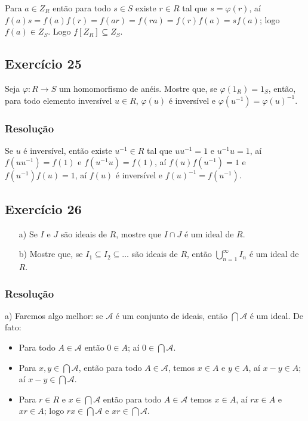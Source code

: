 \documentclass[10pt,a4paper]{article}
\begin{document}
Para $a\in Z_R$ então para todo $s\in S$ existe $r\in R$ tal que $s=\varphi(r)$, aí $f(a)s=f(a)f(r)=f(ar)=f(ra)=f(r)f(a)=sf(a)$; logo $f(a)\in Z_S$. Logo $f[Z_R]\subseteq Z_S$.

\subsection*{Exercício 25}
Seja $\varphi:R\rightarrow S$ um homomorfismo de anéis. Mostre que, se $\varphi(1_R)=1_S$, então, para todo elemento inversível $u\in R$, $\varphi(u)$ é inversível e $\varphi(u^{-1})=\varphi(u)^{-1}$.

\subsubsection*{Resolução}

Se $u$ é inversível, então existe $u^{-1}\in R$ tal que $uu^{-1}=1$ e $u^{-1}u=1$, aí $f(uu^{-1})=f(1)$ e $f(u^{-1}u)=f(1)$, aí $f(u)f(u^{-1})=1$ e $f(u^{-1})f(u)=1$, aí $f(u)$ é inversível e $f(u)^{-1}=f(u^{-1})$.

\subsection*{Exercício 26}
\begin{itemize}
\item[a)] Se $I$ e $J$ são ideais de $R$, mostre que $I\cap J$ é um ideal de $R$.
\item[b)] Mostre que, se $I_1\subseteq I_2\subseteq \dots$ são ideais de $R$, então $\bigcup_{n=1}^\infty I_n$ é um ideal de $R$.
\end{itemize}

\subsubsection*{Resolução}

a) Faremos algo melhor: se $\mathcal{A}$ é um conjunto de ideais, então $\bigcap\mathcal{A}$ é um ideal. De fato:
\begin{itemize}
\item Para todo $A\in\mathcal{A}$ então $0\in A$; aí $0\in\bigcap\mathcal{A}$.
\item Para $x,y\in\bigcap\mathcal{A}$, então para todo $A\in\mathcal{A}$, temos $x\in A$ e $y\in A$, aí $x-y\in A$; aí $x-y\in\bigcap\mathcal{A}$.
\item Para $r\in R$ e $x\in\bigcap\mathcal{A}$ então para todo $A\in\mathcal{A}$ temos $x\in A$, aí $rx\in A$ e $xr\in A$; logo $rx\in\bigcap\mathcal{A}$ e $xr\in\bigcap\mathcal{A}$.
\end{itemize}
\end{document}
